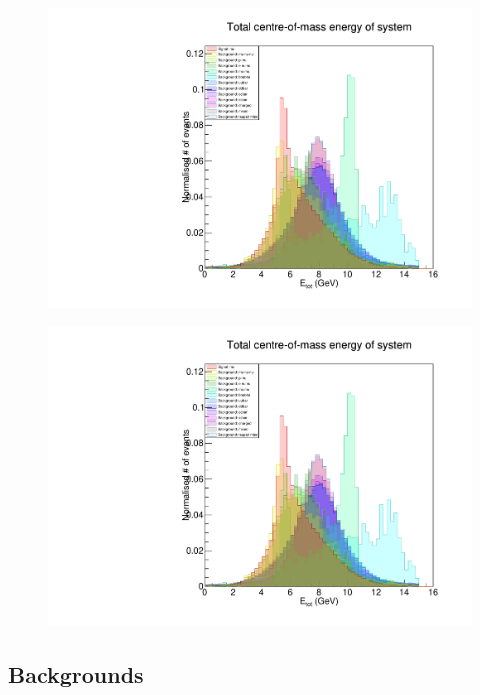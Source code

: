 \documentclass[12pt,a4paper]{article} %
\begin{document}
\begin{figure}[h]
\centering
\begin{minipage}{.5\textwidth}
  \centering
  \includegraphics[width=\linewidth]{images/stack/stack_cut6_totalCM_E.pdf}
  \label{fig:test1}
\end{minipage}%
\begin{minipage}{.5\textwidth}
  \centering
  \includegraphics[width=\linewidth]{images/stack/stack_cut6_totalCM_E.pdf}
  \label{fig:test2}
\end{minipage}
\end{figure}


\subsection{Backgrounds}
\end{document}
